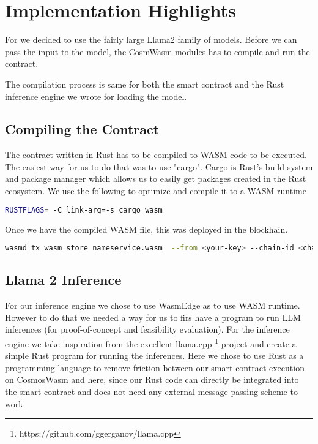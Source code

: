 \section{Implementation Highlights}

For \sln{} we decided to use the fairly large Llama2\cite{touvron2023llama} family of models. Before we can pass the input to the model, the CosmWasm modules has to compile and run the contract.

The compilation process is same for both the smart contract and the Rust inference engine we wrote for loading the model. 

\subsection{Compiling the Contract}\label{compilecontract}
The contract written in Rust has to be compiled to WASM code to be executed. The easiest way for us to do that was to use "cargo". Cargo is Rust's build system and package manager which allows us to easily get packages created in the Rust ecosystem. We use the following to optimize and compile it to a WASM runtime

\begin{lstlisting}[caption={WasmCosm Contract Compile},breaklines, language=bash, label=contractcompile]
RUSTFLAGS= -C link-arg=-s cargo wasm
\end{lstlisting}

Once we have the compiled WASM file, this was deployed in the blockhain.
\begin{lstlisting}[caption={WasmCosm Contract Store},breaklines, language=bash, label=contractcompile]
wasmd tx wasm store nameservice.wasm  --from <your-key> --chain-id <chain-id> --gas auto
\end{lstlisting}

\subsection{Llama 2 Inference}\label{llamainfer}

For our inference engine we chose to use WasmEdge as to use WASM runtime. However to do that we needed a way for us to firs have a program to run LLM inferences (for proof-of-concept and feasibility evaluation). For the inference engine we take inspiration from the excellent llama.cpp \footnote{https://github.com/ggerganov/llama.cpp} project and create a simple Rust program for running the inferences. Here we chose to use Rust as a programming language to remove friction between our smart contract execution on CosmosWasm and here, since our Rust code can directly be integrated into the smart contract and does not need any external message passing scheme to work. 

